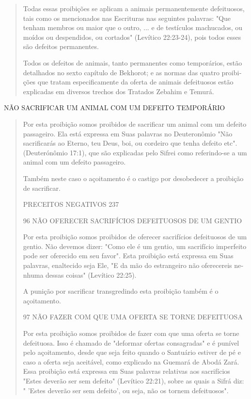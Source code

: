 \begin{quote}
Todas essas proibições se aplicam a animais permanentemente
de­feituosos, tais como os mencionados nas Escrituras nas seguintes
palavras: "Que tenham membros ou maior que o outro, ... e de testículos
machucados, ou moí­dos ou despendidos, ou cortados" (Levítico 22:23-24),
pois todos esses são de­feitos permanentes.

Todos os defeitos de animais, tanto permanentes como temporários, estão
detalhados no sexto capítulo de Bekhorot; e as normas das quatro
proibi­ções que tratam especificamente da oferta de animais defeituosos
estão expli­cadas em diversos trechos dos Tratados Zebahim e Temurá.
\end{quote}

NÃO SACRIFICAR UM ANIMAL COM UM DEFEITO TEMPORÁRIO

\begin{quote}
Por esta proibição somos proibidos de sacrificar um animal com um
defeito passageiro. Ela está expressa em Suas palavras no Deuteronômio
"Não sacrificarás ao Eterno, teu Deus, boi, ou cordeiro que tenha
defeito etc". (Deu­terónômio 17:1), que são explicadas pelo Sifrei como
referindo-se a um animal com um defeito passageiro.

Também neste caso o açoitamento é o castigo por desobedecer a proi­bição
de sacrificar.

PRECEITOS NEGATIVOS 237

96 NÃO OFERECER SACRIFÍCIOS DEFEITUOSOS DE UM GENTIO

Por esta proibição somos proibidos de oferecer sacrifícios defeituo­sos
de um gentio. Não devemos dizer: "Como ele é um gentio, um sacrifício
imperfeito pode ser oferecido em seu favor". Esta proibição está
expressa em Suas palavras, enaltecido seja Ele, "E da mão do estrangeiro
não oferecereis ne­nhuma dessas coisas" (Levítico 22:25).

A punição por sacrificar transgredindo esta proibição também é o
açoitamento.

97 NÃO FAZER COM QUE UMA OFERTA SE TORNE DEFEITUOSA

Por esta proibição somos proibidos de fazer com que uma oferta se torne
defeituosa. Isso é chamado de "deformar ofertas consagradas" e é
puní­vel pelo açoitamento, desde que seja feito quando o Santuário
estiver de pé e caso a oferta seja aceitável, como explicado na Guemará
de Abodá Zará. Essa proibição está expressa em Suas palavras relativas
aos sacrifícios "Estes deve­rão ser sem defeito" (Levítico 22:21), sobre
as quais a Sifrá diz: " 'Estes deve­rão ser sem defeito', ou seja, não
os tornem defeituosos".


\end{quote}
